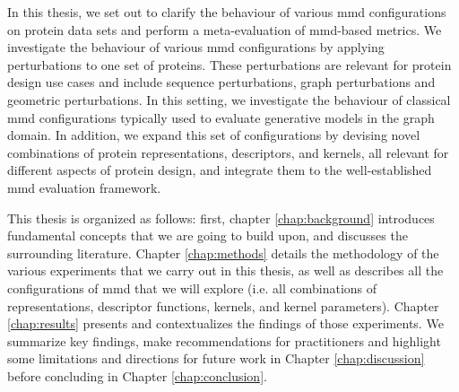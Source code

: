 In this thesis, we set out to clarify the behaviour of various \acrshort{mmd}
configurations on protein data sets and perform a meta-evaluation of \acrshort{mmd}-based
metrics. We investigate the behaviour of various \acrshort{mmd} configurations by applying
perturbations to one set of proteins. These perturbations are relevant for
protein design use cases and include sequence perturbations, graph perturbations
and geometric perturbations. In this setting, we investigate the behaviour of
classical \acrshort{mmd} configurations typically used to evaluate generative models in the
graph domain. In addition, we expand this set of configurations by devising
novel combinations of protein representations, descriptors, and kernels, all
relevant for different aspects of protein design, and integrate them to the
well-established \acrshort{mmd} evaluation framework.

This thesis is organized as follows: first, chapter \ref{chap:background}
introduces fundamental concepts that we are going to build upon, and discusses
the surrounding literature. Chapter \ref{chap:methods} details the methodology
of the various experiments that we carry out in this thesis, as well as
describes all the configurations of \acrshort{mmd} that we will explore (i.e. all
combinations of representations, descriptor functions, kernels, and kernel
parameters). Chapter \ref{chap:results} presents and contextualizes the findings of those
experiments. We summarize key findings, make recommendations for practitioners and
highlight some limitations and directions for future work in Chapter
\ref{chap:discussion} before concluding in Chapter \ref{chap:conclusion}.





